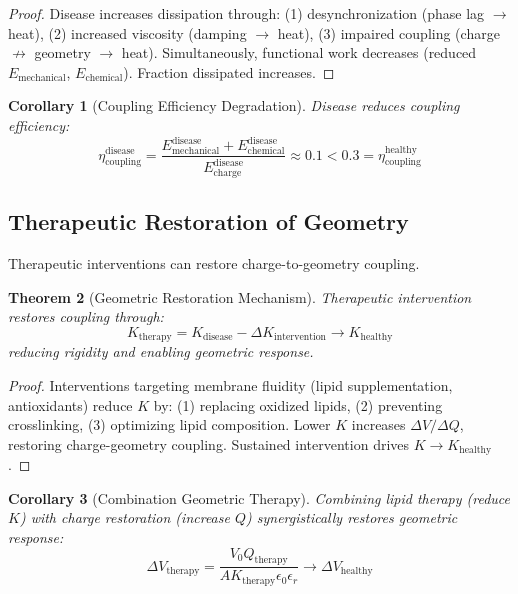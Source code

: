 \documentclass[11pt,twocolumn,a4paper]{article}
\newtheorem{theorem}{Theorem}[section]
\newtheorem{corollary}[theorem]{Corollary}
\theoremstyle{definition}
\theoremstyle{remark}
\begin{document}
\begin{proof}
Disease increases dissipation through: (1) desynchronization (phase lag $\to$ heat), (2) increased viscosity (damping $\to$ heat), (3) impaired coupling (charge $\not\to$ geometry $\to$ heat). Simultaneously, functional work decreases (reduced $E_{\text{mechanical}}$, $E_{\text{chemical}}$). Fraction dissipated increases.
\end{proof}

\begin{corollary}[Coupling Efficiency Degradation]
\label{cor:efficiency_degradation}
Disease reduces coupling efficiency:
\begin{equation}
\eta_{\text{coupling}}^{\text{disease}} = \frac{E_{\text{mechanical}}^{\text{disease}} + E_{\text{chemical}}^{\text{disease}}}{E_{\text{charge}}^{\text{disease}}} \approx 0.1 < 0.3 = \eta_{\text{coupling}}^{\text{healthy}}
\end{equation}
\end{corollary}

\subsection{Therapeutic Restoration of Geometry}

Therapeutic interventions can restore charge-to-geometry coupling.

\begin{theorem}[Geometric Restoration Mechanism]
\label{thm:geometric_restoration}
Therapeutic intervention restores coupling through:
\begin{equation}
K_{\text{therapy}} = K_{\text{disease}} - \Delta K_{\text{intervention}} \to K_{\text{healthy}}
\end{equation}
reducing rigidity and enabling geometric response.
\end{theorem}

\begin{proof}
Interventions targeting membrane fluidity (lipid supplementation, antioxidants) reduce $K$ by: (1) replacing oxidized lipids, (2) preventing crosslinking, (3) optimizing lipid composition. Lower $K$ increases $\Delta V/\Delta Q$, restoring charge-geometry coupling. Sustained intervention drives $K \to K_{\text{healthy}}$.
\end{proof}

\begin{corollary}[Combination Geometric Therapy]
\label{cor:combination_geometric}
Combining lipid therapy (reduce $K$) with charge restoration (increase $Q$) synergistically restores geometric response:
\begin{equation}
\Delta V_{\text{therapy}} = \frac{V_0 Q_{\text{therapy}}}{A K_{\text{therapy}} \epsilon_0 \epsilon_r} \to \Delta V_{\text{healthy}}
\end{equation}
\end{corollary}
\end{document}
